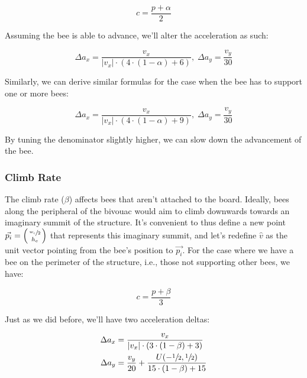 \documentclass[a4paper,10pt]{article}
\begin{document}
\begin{multicols}{2}
    \begin{equation}
        c = \frac{p + \alpha}{2}
    \end{equation}

    Assuming the bee is able to advance, we'll alter the acceleration as such:

    \begin{equation}
        \Delta a_{x} = \frac{v_{x}}{|v_{x}| \cdot (4 \cdot  (1-\alpha) + 6)}, \;
        \Delta a_{y} = \frac{v_{y}}{30}
    \end{equation}

    Similarly, we can derive similar formulas for the case when the bee has to support one or
    more bees:

    \begin{equation}
        \Delta a_{x} = \frac{v_{x}}{|v_{x}| \cdot (4 \cdot  (1-\alpha) + 9)}, \;
        \Delta a_{y} = \frac{v_{y}}{30}
    \end{equation}

    By tuning the denominator slightly higher, we can slow down the advancement of the bee.

    \subsubsection{Climb Rate}

    The climb rate ($\beta$) affects bees that aren't attached to the board. Ideally, bees along the
    peripheral of the bivouac would aim to climb downwards towards an imaginary summit of the
    structure. It's convenient to thus define a new point
    $\vec{p_{i}} = \begin{psmallmatrix} \sfrac{w_{c}}{2} \\ h_{c} \end{psmallmatrix}$ that
    represents this imaginary summit, and let's redefine $\hat v$ as the unit vector pointing from the
    bee's position to $\vec{p_{i}}$. For the case where we have a bee on the perimeter of the structure,
    i.e., those not supporting other bees, we have:

    \begin{equation}
        c = \frac{p + \beta}{3}
    \end{equation}

    Just as we did before, we'll have two acceleration deltas:

    \begin{equation}
        \begin{split}
            \Delta a_{x} &= \frac{v_{x}}{|v_{x}| \cdot (3 \cdot  (1-\beta) + 3)} \\
            \Delta a_{y} &= \frac{v_{y}}{20} + \frac{U(-\sfrac{1}{2}, \sfrac{1}{2})}{15 \cdot (1-\beta) + 15}
        \end{split}
    \end{equation}


\end{multicols}
\end{document}
